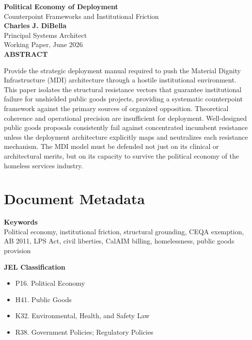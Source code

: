 \documentclass[12pt, letterpaper]{article}
\begin{document}
\captionsetup[table]{labelfont=normalfont, labelsep=period, skip=6pt}

\begin{titlepage}
\begin{center}
{\LARGE \textbf{Political Economy of Deployment}}\\[6pt]
{\large Counterpoint Frameworks and Institutional Friction}\\[0.5cm]
{\normalsize \textbf{Charles J. DiBella}}\\[0.01cm]
{\normalsize Principal Systems Architect}\\[0.01cm]
{\normalsize Working Paper, June 2026}\\[0.3cm]
\textbf{ABSTRACT}
\vspace{0.2cm}
\end{center}
\begin{minipage}{0.95\textwidth}
\noindent
Provide the strategic deployment manual required to push the Material Dignity Infrastructure (MDI) architecture through a hostile institutional environment. This paper isolates the structural resistance vectors that guarantee institutional failure for unshielded public goods projects, providing a systematic counterpoint framework against the primary sources of organized opposition. Theoretical coherence and operational precision are insufficient for deployment. Well-designed public goods proposals consistently fail against concentrated incumbent resistance unless the deployment architecture explicitly maps and neutralizes each resistance mechanism. The MDI model must be defended not just on its clinical or architectural merits, but on its capacity to survive the political economy of the homeless services industry.
\end{minipage}
\end{titlepage}


\newpage
\section*{Document Metadata}

\noindent\textbf{Keywords}\\[1pt]
Political economy, institutional friction, structural grounding, CEQA exemption, AB 2011, LPS Act, civil liberties, CalAIM billing, homelessness, public goods provision

\vspace{8pt}
\noindent\textbf{JEL Classification}
\begin{itemize}[nosep, before={\vspace{-8pt}}, leftmargin=2em]
    \item P16. Political Economy
    \item H41. Public Goods
    \item K32. Environmental, Health, and Safety Law
    \item R38. Government Policies; Regulatory Policies
\end{itemize}
\end{document}
